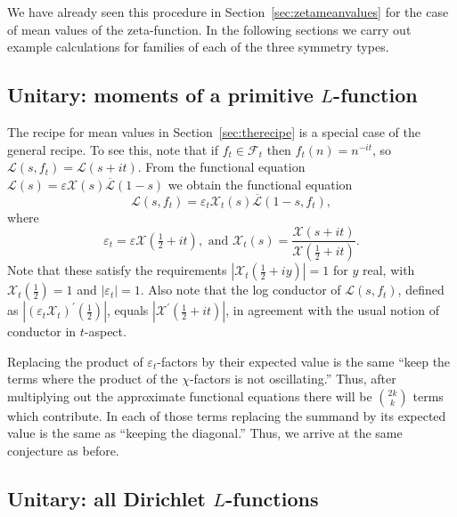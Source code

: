 \documentclass[12pt,letterpaper]{amsart}
\theoremstyle{plain}
\theoremstyle{definition}
\theoremstyle{remark}
\numberwithin{equation}{subsection}
\numberwithin{theorem}{subsection}
\numberwithin{table}{subsection}
\begin{document}
We have already seen this procedure in Section~\ref{sec:zetameanvalues} for the case of
mean values of the zeta-function. In the following sections we
carry out example calculations for families of each of the three
symmetry types.

\subsection{ Unitary: moments of a primitive $L$-function
}\label{sec:unitarymean}

The recipe for mean values in Section~\ref{sec:therecipe} is a special case
of the general recipe.  To see this, note that if
$f_t\in \mathcal{F}_t$ then $f_t(n)=n^{-it}$,
so $\mathcal{L}(s,f_t)=\mathcal{L}(s+it)$.  From the
functional equation 
$\mathcal{L}(s) = \varepsilon \mathcal{X}(s) \overline{\mathcal{L}}(1-s)$ 
we obtain the functional equation
\begin{equation}
\mathcal{L}(s,f_t) = \varepsilon_t \mathcal{X}_t(s) \overline{\mathcal{L}}(1-s,f_t),
\end{equation}
where
\begin{equation}
\varepsilon_t = {\varepsilon}{ \mathcal{X}(\tfrac12+it)},
\text{\ \ \ \ \ \ \ \ and \ \ \ \ \ \ \ \ \ }
\mathcal{X}_t(s) = \frac{\mathcal{X}(s+it)}{ \mathcal{X}(\tfrac12+it)} .
\end{equation}
Note that these satisfy the requirements 
$|\mathcal{X}_t(\frac12 + iy)| = 1$ for $y$ real, with 
$\mathcal{X}_t(\frac12) = 1$ and 
$|\varepsilon_t|=1$.  
Also note that the log conductor of $\mathcal{L}(s,f_t)$, defined
as $|(\varepsilon_t\mathcal{X}_t)^\prime(\frac12)|$, equals $|\mathcal{X}^\prime(\frac12 +it)|$,
in agreement with the usual notion of conductor in $t$-aspect.

Replacing the product of 
$\varepsilon_t$-factors by their expected value is the same
``keep the terms where the product of the $\chi$-factors is not oscillating.''
Thus, after multiplying out
the approximate functional equations there will be
$\binom{2k}{k}$ terms which contribute.  
In each of those terms replacing the
summand by its expected value is the same as ``keeping the diagonal.''
Thus, we arrive at the same conjecture as before.


\subsection{ Unitary: all Dirichlet $L$-functions
}\label{sec:unitary}
\end{document}
